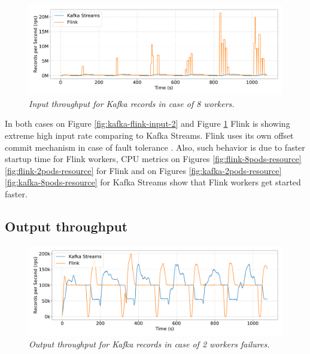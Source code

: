 \begin{figure}[H]
    \centering
    \includegraphics[width=1\textwidth]{figures/kafka-flink/input-throughput-8pod-kafka-flink}
    \caption{\textit{Input throughput for Kafka records in case of 8 workers.}}
    \label{fig:kafka-flink-input-8}
\end{figure}


In both cases on Figure \ref{fig:kafka-flink-input-2} and Figure \ref{fig:kafka-flink-input-8}
Flink is showing extreme high input rate comparing to Kafka Streams.
Flink uses its own offset commit mechanism in case of fault tolerance \cite{flink_kafka_offset}.
Also, such behavior is due to faster startup time for Flink workers, CPU metrics
on Figures \ref{fig:flink-8pods-resource} \ref{fig:flink-2pods-resource} for Flink
and on Figures \ref{fig:kafka-2pods-resource} \ref{fig:kafka-8pods-resource} for Kafka Streams
show that Flink workers get started faster.


\subsection{Output throughput}\label{subsec:output-throughtput}

\begin{figure}[H]
    \centering
    \includegraphics[width=1\textwidth]{figures/kafka-flink/output-throught-2pods-kafka-flink}
    \caption{\textit{Output throughput for Kafka records in case of 2 workers failures.}}
    \label{fig:kafka-flink-out-2}
\end{figure}



